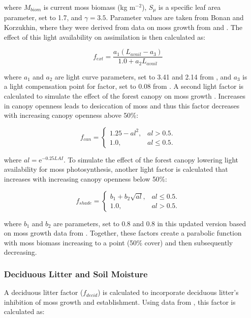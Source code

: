 \documentclass[a4paper, 12pt] {report}
\begin{document}
where $M_{biom}$ is current moss biomass (kg m$^{-2}$), $S_\mu$ is a specific leaf area parameter, set to 1.7, and $\gamma = 3.5$. Parameter values are taken from Bonan and Korzukhin, where they were derived from data on moss growth from  and . The effect of this light availability on assimilation is then calculated as:

\begin{equation}
f_{ext} = \frac{a_1(L_{avail} - a_3)}{1.0 + a_2L_{avail}}
\end{equation}

where $a_1$ and $a_2$ are light curve parameters, set to 3.41 and 2.14 from , and $a_3$ is a light compensation point for factor, set to 0.08 from . A second light factor is calculated to simulate the effect of the forest canopy on moss growth \cite{bonanSimulationMossTree1989}. Increases in canopy openness leads to desiccation of moss and thus this factor decreases with increasing canopy openness above 50\%:

\begin{equation}
f_{can} = \begin{cases}
1.25 - al^2, & \text{$al > 0.5$}.\\
1.0, & \text{$al \leq 0.5$}.
\end{cases}
\end{equation}

where $al = \text{e}^{-0.25LAI}$. To simulate the effect of the forest canopy lowering light availability for moss photosynthesis, another light factor is calculated that increases with increasing canopy  openness below 50\%:

\begin{equation}
f_{shade} = \begin{cases}
b_1 + b_2\sqrt{al}, & \text{$al \leq 0.5$}.\\
1.0, & \text{$al > 0.5$}.
\end{cases}
\end{equation}

where $b_1$ and $b_2$ are parameters, set to 0.8 and 0.8 in this updated version based on moss growth data from  . Together, these factors create a parabolic function with moss biomass increasing to a point (50\% cover) and then subsequently decreasing.

\subsubsection{Deciduous Litter and Soil Moisture}
A deciduous litter factor ($f_{decid}$) is calculated to incorporate deciduous litter's inhibition of moss growth and establishment. Using data from \cite{jeanMurphyDomeMoss2017}, this factor is calculated as:
\end{document}
